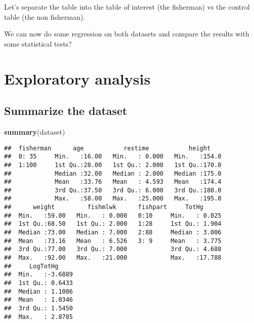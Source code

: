 \documentclass[12pt,]{article}
\newenvironment{Shaded}{\begin{snugshade}}{\end{snugshade}}
\newcommand{\KeywordTok}[1]{\textcolor[rgb]{0.13,0.29,0.53}{\textbf{#1}}}
\newcommand{\DecValTok}[1]{\textcolor[rgb]{0.00,0.00,0.81}{#1}}
\newcommand{\OperatorTok}[1]{\textcolor[rgb]{0.81,0.36,0.00}{\textbf{#1}}}
\newcommand{\NormalTok}[1]{#1}
\begin{document}
Let's separate the table into the table of interest (the fisherman) vs
the control table (the non fisherman).

\begin{Shaded}
\end{Shaded}

We can now do some regression on both datasets and compare the results
with some statistical tests?

\section{Exploratory analysis}\label{exploratory-analysis}

\subsection{Summarize the dataset}\label{summarize-the-dataset}

\begin{Shaded}
\begin{Highlighting}[]
\KeywordTok{summary}\NormalTok{(dataset)}
\end{Highlighting}
\end{Shaded}

\begin{verbatim}
##  fisherman      age           restime           height     
##  0: 35     Min.   :16.00   Min.   : 0.000   Min.   :154.0  
##  1:100     1st Qu.:28.00   1st Qu.: 2.000   1st Qu.:170.0  
##            Median :32.00   Median : 2.000   Median :175.0  
##            Mean   :33.76   Mean   : 4.593   Mean   :174.4  
##            3rd Qu.:37.50   3rd Qu.: 6.000   3rd Qu.:180.0  
##            Max.   :58.00   Max.   :25.000   Max.   :195.0  
##      weight         fishmlwk      fishpart     TotHg       
##  Min.   :59.00   Min.   : 0.000   0:10     Min.   : 0.025  
##  1st Qu.:68.50   1st Qu.: 2.000   1:28     1st Qu.: 1.904  
##  Median :73.00   Median : 7.000   2:88     Median : 3.006  
##  Mean   :73.16   Mean   : 6.526   3: 9     Mean   : 3.775  
##  3rd Qu.:77.00   3rd Qu.: 7.000            3rd Qu.: 4.688  
##  Max.   :92.00   Max.   :21.000            Max.   :17.788  
##     LogTotHg      
##  Min.   :-3.6889  
##  1st Qu.: 0.6433  
##  Median : 1.1006  
##  Mean   : 1.0346  
##  3rd Qu.: 1.5450  
##  Max.   : 2.8785
\end{verbatim}
\end{document}
